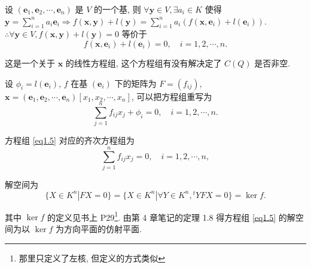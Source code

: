 \documentclass{ctexart}
\begin{document}
设 $(\boldsymbol{e}_1,\boldsymbol{e}_2,\cdots,\boldsymbol{e}_n)$ 是 $V$ 的一个基, 则 $\forall\boldsymbol{y}\in V,\exists a_i\in K$ 使得 $\boldsymbol{y}=\sum\limits_{i=1}^na_i\boldsymbol{e}_i\Rightarrow f(\boldsymbol{x},\boldsymbol{y})+l(\boldsymbol{y})=\sum\limits_{i=1}^na_i(f(\boldsymbol{x},\boldsymbol{e}_i)+l(\boldsymbol{e}_i))$. $\therefore\forall\boldsymbol{y}\in V,f(\boldsymbol{x},\boldsymbol{y})+l(\boldsymbol{y})=0$ 等价于
\[f(\boldsymbol{x},\boldsymbol{e}_i)+l(\boldsymbol{e}_i)=0,\quad i=1,2,\cdots,n.\]

这是一个关于 $\boldsymbol{x}$ 的线性方程组, 这个方程组有没有解决定了 $C(Q)$ 是否非空.

设 $\phi_i=l(\boldsymbol{e}_i)$, $f$ 在基 $(\boldsymbol{e}_i)$ 下的矩阵为 $F=(f_{ij})$, $\boldsymbol{x}=(\boldsymbol{e}_1,\boldsymbol{e}_2,\cdots,\boldsymbol{e}_n)[x_1,x_2,\cdots,x_n]$, 可以把方程组重写为
\begin{equation}\label{eq1.5}
    \sum\limits_{j=1}^nf_{ij}x_j+\phi_i=0,\quad i=1,2,\cdots,n.
\end{equation}

方程组 \ref{eq1.5} 对应的齐次方程组为
\[\sum\limits_{j=1}^nf_{ij}x_j=0,\quad i=1,2,\cdots,n,\]

解空间为
\[\{X\in K^n|FX=0\}=\{X\in K^n|\forall Y\in K^n,{}^tYFX=0\}=\ker f.\]

其中 $\ker f$ 的定义见书上 P29\footnote{那里只定义了左核, 但定义的方式类似}. 由第 4 章笔记的定理 1.8 得方程组 \ref{eq1.5} 的解空间为以 $\ker f$ 为方向平面的仿射平面.
\end{document}
